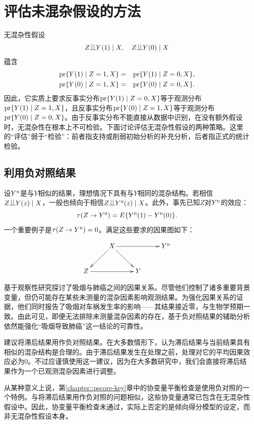 \section{评估未混杂假设的方法}


无混杂性假设$$
Z\ind Y(1) \mid X, \quad 
Z\ind Y(0) \mid X
$$蕴含\begin{eqnarray*}
\textup{pr}\{ Y(1)\mid  Z=1, X \}  &=& \textup{pr}\{ Y(1)\mid  Z=0, X \} , \\
\textup{pr}\{ Y(0)\mid  Z=1, X \} &=& \textup{pr}\{ Y(0)\mid  Z=0, X \} . 
\end{eqnarray*}因此，它实质上要求反事实分布$\textup{pr}\{ Y(1)\mid  Z=0, X \}$等于观测分布$\textup{pr}\{ Y(1)\mid  Z=1, X \}$，且反事实分布$\textup{pr}\{ Y(0)\mid  Z=1, X \} $等于观测分布$\textup{pr}\{ Y(0)\mid  Z=0, X \}$。由于反事实分布不能直接从数据中识别，在没有额外假设时，无混杂性在根本上不可检验。下面讨论评估无混杂性假设的两种策略。这里的“评估”弱于“检验”：前者指支持或削弱初始分析的补充分析，后者指正式的统计检验。 



\subsection{利用负对照结果}


 

设$Y^\textup{n}$是与$Y$相似的结果，理想情况下具有与$Y$相同的混杂结构。若相信$Z\ind Y(z)\mid X$，一般也倾向于相信$Z\ind Y^\textup{n} (z)\mid X$。此外，事先已知$Z$对$Y^\textup{n}$的效应：$$
\tau(Z\rightarrow Y^\textup{n} )
= 
E\{  Y^\textup{n}(1) - Y^\textup{n}(0) \} .
$$一个重要例子是$\tau(Z\rightarrow Y^\textup{n} ) = 0$。满足这些要求的因果图如下：

$$
\xymatrix{
 & X \ar[ld]\ar[rd] \ar[rr] & & Y^\textup{n}  \\
Z\ar[rr] &&Y 
}
$$



\begin{example}
\citet{Cornfield::1959}基于观察性研究探讨了吸烟与肺癌之间的因果关系。尽管他们控制了诸多重要背景变量，但仍可能存在某些未测量的混杂因素影响观测结果。为强化因果关系的证据，他们同时报告了吸烟对车祸发生率的影响——其结果接近零，与生物学预期一致。由此可见，即便无法排除未测量混杂因素的存在，基于负对照结果的辅助分析依然能强化“吸烟导致肺癌”这一结论的可靠性。
\end{example}

\begin{example}
\citet{imbens2015causal}建议将滞后结果用作负对照结果。在大多数情形下，认为滞后结果与当前结果具有相似的混杂结构是合理的。由于滞后结果发生在处理之前，处理对它的平均因果效应必为$0$。不过应谨慎使用这一建议，因为在大多数研究中，我们会直接将滞后结果作为一个已观测混杂因素进行调整。 

从某种意义上说，第\ref{chapter::pscore-key}章中的协变量平衡检查是使用负对照的一个特例。与将滞后结果用作负对照的问题相似，这些协变量通常已包含在无混杂性假设中。因此，协变量平衡检查未通过，实际上否定的是倾向得分模型的设定，而非无混杂性假设本身。 
\end{example}

